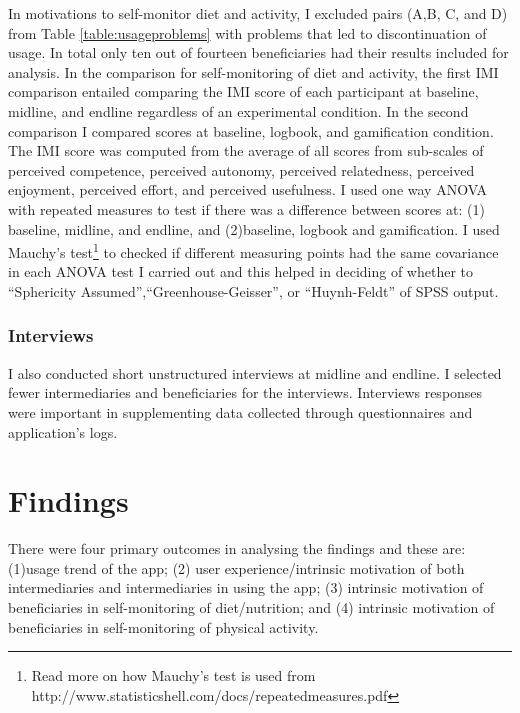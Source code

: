 In motivations to self-monitor diet and activity, I excluded pairs (A,B, C, and D) from Table \ref{table:usageproblems} with problems that led to discontinuation of usage. In total only ten out of fourteen beneficiaries had their results included for analysis. In the comparison for self-monitoring of diet and activity, the first IMI comparison  entailed comparing the IMI score of each participant at baseline, midline, and endline regardless of an experimental condition. In the second comparison I compared scores at baseline, logbook, and gamification condition. The IMI score was computed from the average of all scores from sub-scales of perceived competence, perceived autonomy, perceived relatedness, perceived enjoyment, perceived effort,  and perceived usefulness. I  used one way ANOVA with repeated measures to test if there was a difference  between scores at: (1) baseline, midline, and endline, and (2)baseline, logbook and gamification. I used Mauchy's test\footnote{Read more on how Mauchy's test is used from http://www.statisticshell.com/docs/repeatedmeasures.pdf} to checked if different measuring points had the same covariance in each ANOVA test I carried out and this helped in deciding of whether to ``Sphericity Assumed'',``Greenhouse-Geisser'', or ``Huynh-Feldt'' of SPSS output.
\subsubsection{Interviews}
I also conducted short unstructured interviews at midline and endline. I selected fewer intermediaries and beneficiaries for the interviews. Interviews responses were important in supplementing data collected through questionnaires and application's logs.
\section{Findings}
There were four primary outcomes in analysing the findings and these are: (1)usage trend of the app; (2) user experience/intrinsic motivation  of both intermediaries and intermediaries in using the app; (3) intrinsic motivation of beneficiaries in self-monitoring of diet/nutrition; and (4) intrinsic motivation of beneficiaries in self-monitoring of physical activity.
